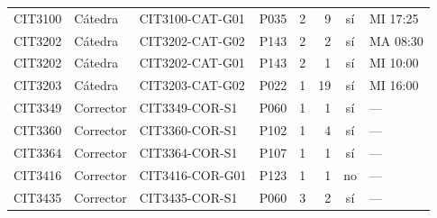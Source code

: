 \begin{longtable}{llllrrcl}
CIT3100 & Cátedra & CIT3100-CAT-G01 & P035 & 2 & 9 & sí & MI 17:25 \\
CIT3202 & Cátedra & CIT3202-CAT-G02 & P143 & 2 & 2 & sí & MA 08:30 \\
CIT3202 & Cátedra & CIT3202-CAT-G01 & P143 & 2 & 1 & sí & MI 10:00 \\
CIT3203 & Cátedra & CIT3203-CAT-G02 & P022 & 1 & 19 & sí & MI 16:00 \\
CIT3349 & Corrector & CIT3349-COR-S1 & P060 & 1 & 1 & sí & — \\
CIT3360 & Corrector & CIT3360-COR-S1 & P102 & 1 & 4 & sí & — \\
CIT3364 & Corrector & CIT3364-COR-S1 & P107 & 1 & 1 & sí & — \\
CIT3416 & Corrector & CIT3416-COR-G01 & P123 & 1 & 1 & no & — \\
CIT3435 & Corrector & CIT3435-COR-S1 & P060 & 3 & 2 & sí & — \\
\end{longtable}
